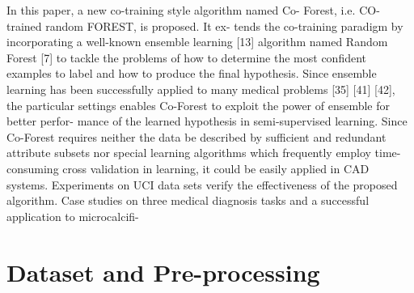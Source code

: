 \documentclass[journal]{IEEEtran}
\begin{document}
In this paper, a new co-training style algorithm named Co- Forest, i.e. CO-trained random FOREST, is proposed. It ex- tends the co-training paradigm by incorporating a well-known ensemble learning [13] algorithm named Random Forest [7] to tackle the problems of how to determine the most confident examples to label and how to produce the final hypothesis. Since ensemble learning has been successfully applied to many medical problems [35] [41] [42], the particular settings enables Co-Forest to exploit the power of ensemble for better perfor- mance of the learned hypothesis in semi-supervised learning. Since Co-Forest requires neither the data be described by sufficient and redundant attribute subsets nor special learning algorithms which frequently employ time-consuming cross validation in learning, it could be easily applied in CAD systems. Experiments on UCI data sets verify the effectiveness of the proposed algorithm. Case studies on three medical diagnosis tasks and a successful application to microcalcifi-
 




\section{Dataset and Pre-processing}
\end{document}
